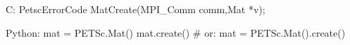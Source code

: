 C:
PetscErrorCode MatCreate(MPI_Comm comm,Mat *v);

Python:
mat = PETSc.Mat()
mat.create()
# or:
mat = PETSc.Mat().create()

